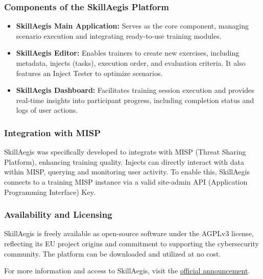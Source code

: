 \subsubsection{Components of the SkillAegis Platform}
\begin{itemize}
	\item \textbf{SkillAegis Main Application:} Serves as the core component, managing scenario execution and integrating ready-to-use training modules.
	\item \textbf{SkillAegis Editor:} Enables trainers to create new exercises, including metadata, injects (tasks), execution order, and evaluation criteria. It also features an Inject Tester to optimize scenarios.
	\item \textbf{SkillAegis Dashboard:} Facilitates training session execution and provides real-time insights into participant progress, including completion status and logs of user actions.
\end{itemize}

\subsubsection{Integration with MISP}
SkillAegis was specifically developed to integrate with MISP (Threat Sharing Platform), enhancing training quality. Injects can directly interact with data within MISP, querying and monitoring user activity. To enable this, SkillAegis connects to a training MISP instance via a valid site-admin API (Application Programming Interface) Key.

\subsubsection{Availability and Licensing}
SkillAegis is freely available as open-source software under the AGPLv3 license, reflecting its EU project origins and commitment to supporting the cybersecurity community. The platform can be downloaded and utilized at no cost.

For more information and access to SkillAegis, visit the \href{https://www.misp-project.org/2024/08/14/SkillAegis-v1.0.0.html/}{official announcement}.


